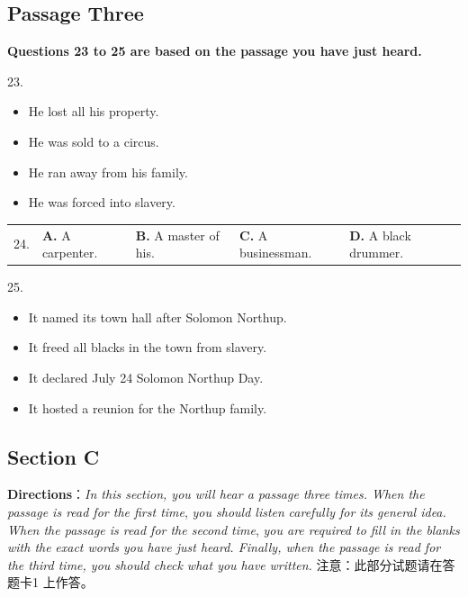 \documentclass[UTF8,11pt]{ctexart}
\begin{document}
\subsection*{\textbf{Passage Three}}


\textbf{Questions 23 to 25 are based on the passage you have just heard.}


23.


\begin{itemize}[leftmargin=2em,itemsep=.2em,topsep=.4em]\item[A.] He lost all his property.
\item[B.] He was sold to a circus.
\item[C.] He ran away from his family.
\item[D.] He was forced into slavery.
\end{itemize}

\noindent\begin{tabularx}{\linewidth}{@{}lXXXX@{}}24. & \textbf{A.} A carpenter. & \textbf{B.} A master of his. & \textbf{C.} A businessman. & \textbf{D.} A black drummer.\\\end{tabularx}\par

25.


\begin{itemize}[leftmargin=2em,itemsep=.2em,topsep=.4em]\item[A.] It named its town hall after Solomon Northup.
\item[B.] It freed all blacks in the town from slavery.
\item[C.] It declared July 24 Solomon Northup Day.
\item[D.] It hosted a reunion for the Northup family.
\end{itemize}

\subsection*{\textbf{Section C}}


\textbf{Directions}：\textit{In this section, you will hear a passage three times. When the passage is read for the first time},\textit{ you should listen} \textit{carefully for its general idea. When the passage is read for the second time},\textit{ you are required to fill in the blanks with the} \textit{exact words you have just heard. Finally, when the passage is read for the third time, you should check what you have} \textit{written.} 注意：此部分试题请在答题卡1 上作答。
\end{document}

